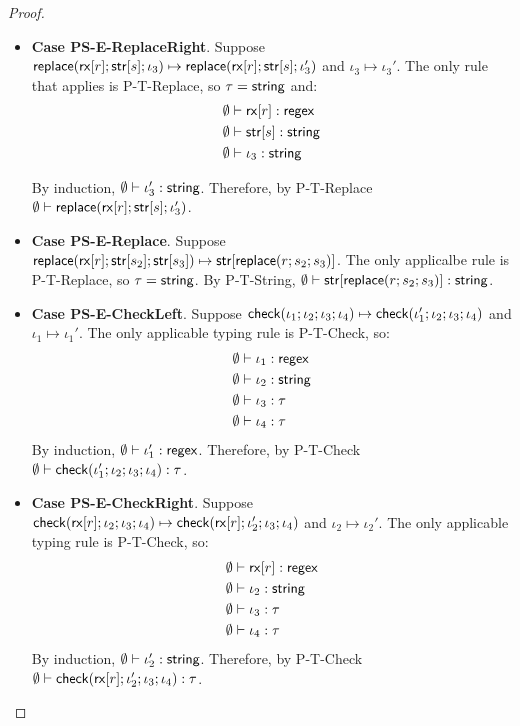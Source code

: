 \documentclass[11pt,leqno]{article}
\theoremstyle{definition}
\newcommand{\tcheck}[4]{{\sf check}(#1; #2; #3; #4)}
\renewcommand{\tstr}[1]{{{\sf str}[#1]}}
\newcommand{\preplace}[3]{{\sf replace}(#1;#2;#3)}
\newcommand{\rx}[1]{ {\sf rx}[#1] }
\newcommand{\str}{{\sf string}}
\newcommand{\regex}{{\sf regex}}
\newcommand{\lsubst}[3]{{\sf replace}(#1;#2;#3)} %
\begin{document}
\begin{proof}
\begin{itemize}[label=$ $,itemsep=1ex]
\item \textbf{Case PS-E-ReplaceRight}. 
Suppose $\preplace{\rx{r}}{\tstr{s}}{\iota_3} \mapsto \preplace{\rx{r}}{\tstr{s}}{\iota_3'}$
and $\iota_3 \mapsto \iota_3'$.
The only rule that applies is P-T-Replace, so $\tau=\str$ and:
\begin{align*}
  \emptyset &\vdash \rx{r} : \regex \\
  \emptyset &\vdash \tstr{s} : \str \\
  \emptyset &\vdash \iota_3 : \str
\end{align*}

By induction, $\emptyset \vdash \iota_3' : \str$.
Therefore, by P-T-Replace $\emptyset \vdash \preplace{\rx{r}}{\tstr{s}}{\iota_3'}$.

\item \textbf{Case PS-E-Replace}. 
Suppose $\preplace{\rx{r}}{\tstr{s_2}}{\tstr{s_3}} \mapsto \tstr{\lsubst{r}{s_2}{s_3}}$. The only applicalbe rule is P-T-Replace, so $\tau=\str$. By P-T-String, $\emptyset \vdash \tstr{\lsubst{r}{s_2}{s_3}} : \str$.

\item \textbf{Case PS-E-CheckLeft}. 
Suppose $\tcheck{\iota_1}{\iota_2}{\iota_3}{\iota_4} \mapsto \tcheck{\iota_1'}{\iota_2}{\iota_3}{\iota_4}$ and $\iota_1\mapsto\iota_1'$.
The only applicable typing rule is P-T-Check, so:
\begin{align*}
  \emptyset &\vdash \iota_1 : \regex \\
  \emptyset &\vdash \iota_2 : \str \\
  \emptyset &\vdash \iota_3 : \tau \\
  \emptyset &\vdash \iota_4 : \tau
\end{align*}
By induction, $\emptyset \vdash \iota_1' : \regex$. Therefore, by P-T-Check 
$\emptyset \vdash \tcheck{\iota_1'}{\iota_2}{\iota_3}{\iota_4} : \tau$.


\item \textbf{Case PS-E-CheckRight}. 
Suppose $\tcheck{\rx{r}}{\iota_2}{\iota_3}{\iota_4} \mapsto \tcheck{\rx{r}}{\iota_2'}{\iota_3}{\iota_4}$ and $\iota_2\mapsto\iota_2'$.
The only applicable typing rule is P-T-Check, so:
\begin{align*}
  \emptyset &\vdash \rx{r} : \regex \\
  \emptyset &\vdash \iota_2 : \str \\
  \emptyset &\vdash \iota_3 : \tau \\
  \emptyset &\vdash \iota_4 : \tau
\end{align*}
By induction, $\emptyset \vdash \iota_2' : \str$. Therefore, by P-T-Check 
$\emptyset \vdash \tcheck{\rx{r}}{\iota_2'}{\iota_3}{\iota_4} : \tau$.


\end{itemize}
\end{proof}
\end{document}
